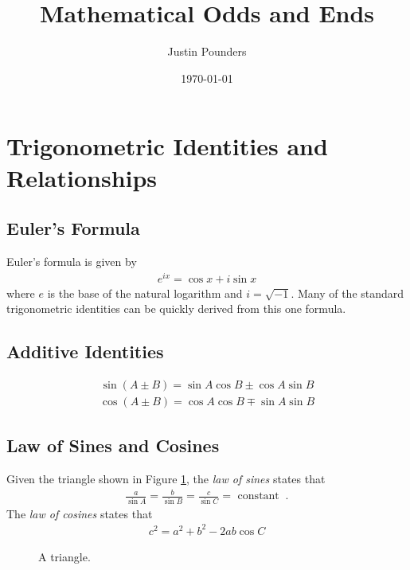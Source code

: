 \documentclass[11pt]{article}
\author{Justin Pounders}
\date{\today}
\title{Mathematical Odds and Ends}
\begin{document}
\maketitle
\tableofcontents

\section{Trigonometric Identities and Relationships}
\label{sec:orgheadline4}
\subsection{Euler's Formula}
\label{sec:orgheadline1}
Euler's formula is given by
\begin{align}
  e^{i x} = \cos x + i \sin x
\end{align}
where \(e\) is the base of the natural logarithm and \(i = \sqrt{-1}\).  Many of the standard trigonometric identities can be quickly derived from this one formula.
\subsection{Additive Identities}
\label{sec:orgheadline2}
\begin{align}
  \sin\left(A \pm B\right) = \sin A \cos B \pm \cos A \sin B
\end{align}
\begin{align}
  \cos\left(A \pm B\right) = \cos A \cos B \mp \sin A \sin B
\end{align}
\subsection{Law of Sines and Cosines}
\label{sec:orgheadline3}
Given the triangle shown in Figure \ref{fig::triangle}, the \emph{law of sines} states that
\begin{align}
  \frac{a}{\sin A} = \frac{b}{\sin B} = \frac{c}{\sin C} = \text{ constant} \;\;.
\end{align}
The \emph{law of cosines} states that
\begin{align}
  c^2 = a^2 + b^2 - 2ab\cos{C}
\end{align}

\begin{figure}
\centering
{}
\caption{A triangle.}
\label{fig::triangle}
\end{figure}
\end{document}
